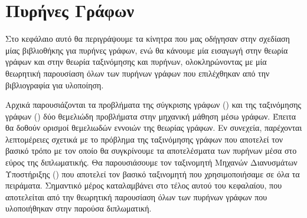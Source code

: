 \chapter{Πυρήνες Γράφων}
\label{chap2}
Στο κεφάλαιο αυτό θα περιγράψουμε τα κίνητρα που μας οδήγησαν στην σχεδίαση μίας βιβλιοθήκης για πυρήνες γράφων, ενώ θα κάνουμε μία εισαγωγή στην θεωρία γράφων και στην θεωρία ταξινόμησης και πυρήνων, ολοκληρώνοντας με μία θεωρητική παρουσίαση όλων των πυρήνων γράφων που επιλέχθηκαν από την βιβλιογραφία για υλοποίηση.\par
Αρχικά παρουσιάζονται τα προβλήματα της σύγκρισης γράφων () και της ταξινόμησης γράφων () δύο θεμελιώδη προβλήματα στην μηχανική μάθηση μέσω γράφων.
Έπειτα θα δοθούν ορισμοί θεμελιωδών εννοιών της θεωρίας γράφων.
Εν συνεχεία, παρέχονται λεπτομέρειες σχετικά με το πρόβλημα της ταξινόμησης γράφων που αποτελεί τον βασικό τρόπο με τον οποίο θα συγκρίνουμε τα αποτελέσματα των πυρήνων μέσα στο εύρος της διπλωματικής.
Θα παρουσιάσουμε τον ταξινομητή Μηχανών Διανυσμάτων Υποστήριξης () που αποτελεί τον βασικό ταξινομητή που χρησιμοποιήσαμε σε όλα τα πειράματα.
Σημαντικό μέρος καταλαμβάνει στο τέλος αυτού του κεφαλαίου, που αποτελείται από την θεωρητική παρουσίαση όλων των πυρήνων γράφων που υλοποιήθηκαν στην παρούσα διπλωματική.
